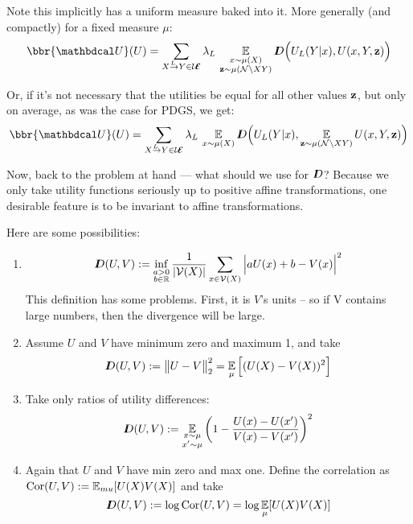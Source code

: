 \documentclass{article}
\newcommand\UEd{\mathcal U\!\!\Ed}
\begin{document}
    Note this implicitly has a uniform measure baked into it. More generally (and compactly) for a fixed measure $\mu$:
    \begin{equation}
        \bbr{\dg U}(U) =
             \sum_{\ed LXY \in \UEd} \lambda_L\, \Ex_{\substack{x \sim \mu(X)\\\mat z \sim \mu(\N\setminus XY)}}
             \thickD\Big( U_L(Y | x),  U(x,Y, \mat z) \Big)
    \end{equation}
    
    Or, if it's not necessary that the utilities be equal for all other values $\mathbf{z}$, but only on average, as was the case for PDGS, we get:
    \begin{equation}
        \bbr{\dg U}(U) =
             \sum_{\ed LXY \in \UEd} \lambda_L\, \Ex_{x \sim \mu(X)}
             \thickD\Big( U_L(Y | x),  \Ex_{\mat z \sim \mu(\N\setminus XY)}U(x,Y, \mat z) \Big)
    \end{equation}

     
    Now, back to the problem at hand --- what should we use for $I\mkern-8muD$? Because we only take utility functions seriously up to positive affine transformations, one desirable feature is to be invariant to affine transformations.
    
    Here are some possibilities:
    
    \begin{enumerate}
    \item \begin{equation*}
        I\mkern-8muD(U, V) := \inf_{\substack{a > 0\\b \in \mathbb R}}  \frac{1}{|\mathcal V(X)|}\sum_{x \in \mathcal V(X)} \Big| a U(x) + b - V(x) \Big|^2
        \end{equation*}
        This definition has some problems. First, it is $V$'s units -- so if V contains large numbers, then the divergence will be large. 
    \item Assume $U$ and $V$ have minimum zero and maximum 1, and take 
    \[ I\mkern-8muD(U,V) := \big\Vert U - V \big\Vert^2_2 = \operatorname*{\mathbb{E}}_\mu \Big[(U(X) - V(X))^2\Big]  \]
    \item Take only ratios of utility differences:
    \[ I\mkern-8muD(U,V) := \operatorname*{\mathbb{E}}_{\substack{x \sim \mu \\ x' \sim \mu}} \left( 1-  \frac{U(x) - U(x')}{V(x)- V(x')}\right)^2
    \]
    \item Again that $U$ and $V$ have min zero and max one. Define the correlation as $\mathrm{Cor}(U,V) := \operatorname*{\mathbb{E}}_{mu}[U(X)V(X)]$ and take 
    \[
        I\mkern-8muD(U,V) := \log \mathrm{Cor}(U,V) = \log \operatorname*{\mathbb{E}}_\mu [U(X) V(X)]
    \]

\end{enumerate}
\end{document}

